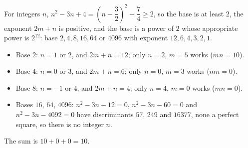 For integers $n$, $n^2-3n+4=\left(n-\dfrac32\right)^2+\dfrac74\ge2$, so the base is at least $2$, the exponent $2m+n$ is positive, and the base is a power of $2$ whose appropriate power is $2^{12}$: base $2,4,8,16,64$ or $4096$ with exponent $12,6,4,3,2,1$.
\begin{itemize}
\item Base $2$: $n=1$ or $2$, and $2m+n=12$; only $n=2$, $m=5$ works ($mn=10$).
\item Base $4$: $n=0$ or $3$, and $2m+n=6$; only $n=0$, $m=3$ works ($mn=0$).
\item Base $8$: $n=-1$ or $4$, and $2m+n=4$; only $n=4$, $m=0$ works ($mn=0$).
\item Bases $16$, $64$, $4096$: $n^2-3n-12=0$, $n^2-3n-60=0$ and $n^2-3n-4092=0$ have discriminants $57$, $249$ and $16377$, none a perfect square, so there is no integer $n$.
\end{itemize}
The sum is $10+0+0=\boxed{10}$.
